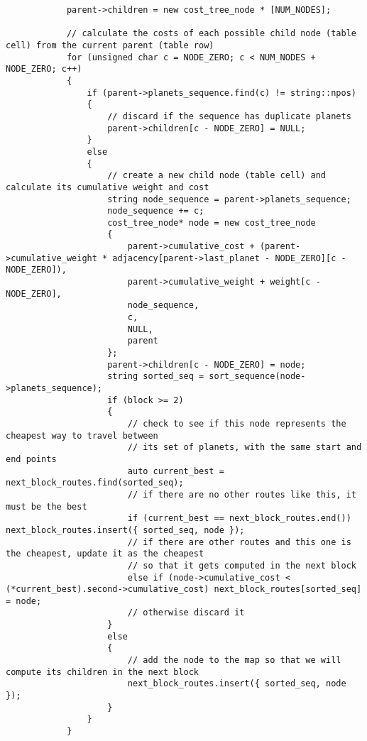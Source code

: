 \documentclass[
]{article}
\begin{document}
\begin{verbatim}
            parent->children = new cost_tree_node * [NUM_NODES];

            // calculate the costs of each possible child node (table cell) from the current parent (table row)
            for (unsigned char c = NODE_ZERO; c < NUM_NODES + NODE_ZERO; c++)
            {
                if (parent->planets_sequence.find(c) != string::npos)
                {
                    // discard if the sequence has duplicate planets
                    parent->children[c - NODE_ZERO] = NULL;
                }
                else
                {
                    // create a new child node (table cell) and calculate its cumulative weight and cost
                    string node_sequence = parent->planets_sequence;
                    node_sequence += c;
                    cost_tree_node* node = new cost_tree_node
                    {
                        parent->cumulative_cost + (parent->cumulative_weight * adjacency[parent->last_planet - NODE_ZERO][c - NODE_ZERO]),
                        parent->cumulative_weight + weight[c - NODE_ZERO],
                        node_sequence,
                        c,
                        NULL,
                        parent
                    };
                    parent->children[c - NODE_ZERO] = node;
                    string sorted_seq = sort_sequence(node->planets_sequence);
                    if (block >= 2)
                    {
                        // check to see if this node represents the cheapest way to travel between
                        // its set of planets, with the same start and end points
                        auto current_best = next_block_routes.find(sorted_seq);
                        // if there are no other routes like this, it must be the best
                        if (current_best == next_block_routes.end()) next_block_routes.insert({ sorted_seq, node });
                        // if there are other routes and this one is the cheapest, update it as the cheapest
                        // so that it gets computed in the next block
                        else if (node->cumulative_cost < (*current_best).second->cumulative_cost) next_block_routes[sorted_seq] = node;
                        // otherwise discard it
                    }
                    else
                    {
                        // add the node to the map so that we will compute its children in the next block
                        next_block_routes.insert({ sorted_seq, node });
                    }
                }
            }


\end{verbatim}
\end{document}
